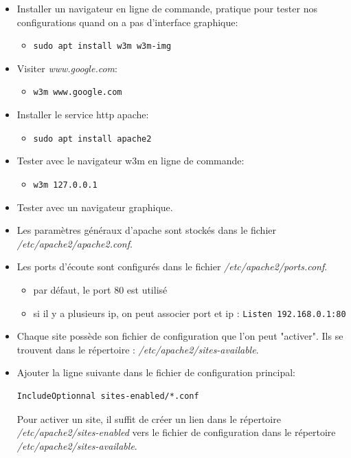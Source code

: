\documentclass[a4paper]{article}
\begin{document}
\begin{itemize}

\item Installer un navigateur en ligne de commande, pratique pour tester nos configurations quand on a pas d’interface graphique:
\begin{itemize}
    \item \texttt{sudo apt install w3m w3m-img}
\end{itemize}

\item Visiter \textit{www.google.com}:
\begin{itemize}
    \item \texttt{w3m www.google.com}
\end{itemize}

\item Installer le service http apache:
\begin{itemize}
    \item \texttt{sudo apt install apache2}
\end{itemize}

\item Tester avec le navigateur w3m en ligne de commande:
\begin{itemize}
    \item \texttt{w3m 127.0.0.1}
\end{itemize}

\item Tester avec un navigateur graphique.

\item Les paramètres généraux d'apache sont stockés dans le fichier \textit{/etc/apache2/apache2.conf}.

\item Les ports d'écoute sont configurés dans le fichier \textit{/etc/apache2/ports.conf}.
\begin{itemize}
    \item par défaut, le port 80 est utilisé
    \item si il y a plusieurs ip, on peut associer port et ip : \texttt{Listen 192.168.0.1:80}
\end{itemize}

\item Chaque site possède son fichier de configuration que l’on peut "activer". Ils se trouvent dans le répertoire : \textit{/etc/apache2/sites-available}.

\item Ajouter la ligne suivante dans le fichier de configuration principal:
\begin{verbatim}
IncludeOptionnal sites-enabled/*.conf
\end{verbatim}
Pour activer un site, il suffit de créer un lien dans le répertoire \textit{/etc/apache2/sites-enabled} vers le fichier de configuration dans le répertoire \textit{/etc/apache2/sites-available}.


\end{itemize}
\end{document}
